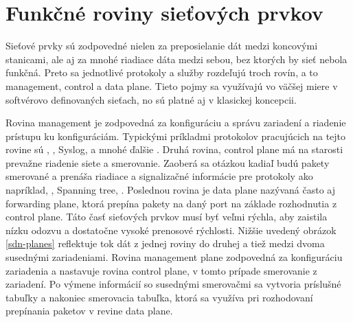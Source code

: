 \section{Funkčné roviny sieťových prvkov}
Sieťové prvky sú zodpovedné nielen za preposielanie dát medzi koncovými stanicami, ale aj za mnohé riadiace dáta medzi sebou, bez ktorých by sieť nebola funkčná. Preto sa jednotlivé protokoly a služby rozdeľujú troch rovín, a to management, control a data plane. Tieto pojmy sa využívajú vo väčšej miere v softvérovo definovaných sieťach, no sú platné aj v klasickej koncepcii.
 
Rovina management je zodpovedná za konfiguráciu a správu zariadení a riadenie prístupu ku konfiguráciám. Typickými príkladmi protokolov pracujúcich na tejto rovine sú , , Syslog,  a mnohé ďalšie \cite{Singh2018}. Druhá rovina, control plane má na starosti prevažne riadenie siete a smerovanie. Zaoberá sa otázkou kadiaľ budú pakety smerované a prenáša riadiace a signalizačné informácie pre protokoly ako napríklad, , Spanning tree,  \cite{Singh2018}. Poslednou rovina je data plane nazývaná často aj forwarding plane, ktorá prepína pakety na daný port na základe rozhodnutia z control plane. Táto časť sieťových prvkov musí byť veľmi rýchla, aby zaistila nízku odozvu a dostatočne vysoké prenosové rýchlosti. Nižšie uvedený obrázok \ref{sdn-planes} reflektuje tok dát z jednej roviny do druhej a tiež medzi dvoma susednými zariadeniami. Rovina management plane zodpovedná za konfiguráciu zariadenia a nastavuje rovina control plane, v tomto prípade smerovanie z zariadení. Po výmene informácií so susednými smerovačmi sa vytvoria príslušné tabuľky a nakoniec smerovacia tabuľka, ktorá sa využíva pri rozhodovaní prepínania paketov v revine data plane.

